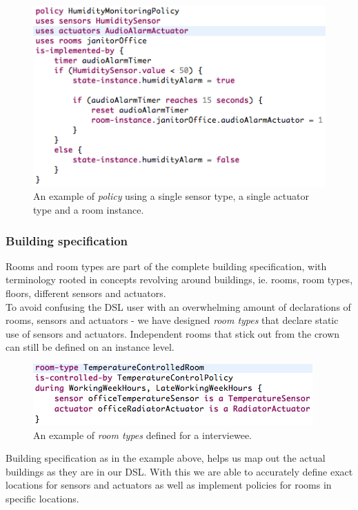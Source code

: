 \begin{figure}[h]
  \centering
    \includegraphics[scale=.5]{dsl-policy-definition.png} 
	\caption{An example of \textit{policy} using a single sensor type, a single actuator type and a room instance.}
	\label{fig:dsl-policy-definition}
\end{figure}

\newpage
\subsubsection{Building specification}\label{subsec:buildingspecification}
Rooms and room types are part of the complete building specification, with terminology rooted in concepts revolving around buildings, ie. rooms, room types, floors, different sensors and actuators. \\

To avoid confusing the DSL user with an overwhelming amount of declarations of rooms, sensors and actuators - we have designed \textit{room types} that declare static use of sensors and actuators. Independent rooms that stick out from the crown can still be defined on an instance level.

\begin{figure}
  \centering
    \includegraphics[scale=.5]{dsl-room-types.png}
	\caption{An example of \textit{room types} defined for a interviewee.}
	\label{fig:room-types}
\end{figure}

Building specification as in the example above, helps us map out the actual buildings as they are in our DSL. With this we are able to accurately define exact locations for sensors and actuators as well as implement policies for rooms in specific locations. 

